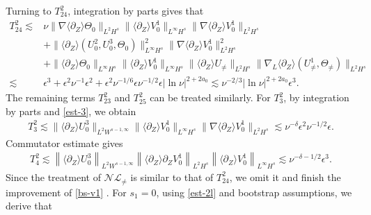 \documentclass[12pt]{article}
\newcommand{\wtb}{\langle\partial_Z\rangle }
\newcommand{\nm}[2]{\left\| #1 \right\| _{#2} }
\numberwithin{equation}{section}
\begin{document}
	Turning to $T^2_{24}$, integration by parts gives that
	\begin{align*}
		T^2_{24}\lesssim& \nu \|\nabla \wtb \Theta_0\|_{L^2H^s}\|\wtb V^1_0\|_{L^\infty H^s}\|\nabla \wtb V^1_0\|_{L^2H^s}\\
		&+\|\wtb (U^{2}_0, U_0^3 ,\Theta_0)\|^2_{L^\infty H^s}\|\nabla \wtb V^1_0\|^2_{L^2H^s}\\
		&+\|\wtb \Theta_0\|_{L^\infty H^s}\|\wtb V^1_0\|_{L^\infty H^s}\|\wtb U_{\neq}\|_{L^2H^s}\|\nabla_L\wtb(U^1_{\neq},\Theta_{\neq})\|_{L^2H^s}\\
        \lesssim& \epsilon^3 +\epsilon^2\nu^{-1}\epsilon^2+\epsilon^2\nu^{-1/6}\epsilon\nu^{-1/2}\epsilon |\ln{\nu}|^{2+2a_0}\lesssim \nu^{-2/3} |\ln{\nu}|^{2+2a_0} \epsilon^3.
	\end{align*}
	The remaining terms $T^2_{23}$ and $T^2_{25}$ can be treated similarly. For $T^2_3$, by integration by parts and \eqref{est-3}, we obtain
	\begin{align*}
		T^2_3\lesssim\|\wtb U^3_0\|_{L^2W^{s-1,\infty}}\|\wtb V^1_0\|_{L^\infty H^s}\|\nabla \wtb V^1_0\|_{L^2H^s}\lesssim \nu^{-\delta}\epsilon^2\nu^{-1/2}\epsilon.
	\end{align*}
    Commutator estimate gives
    \begin{align*}
        T^2_4 \lesssim \nm{\wtb U^3_0}{{L^2W^{s-1,\infty}}}  \nm{\wtb \partial_Z V^1_0}{L^2 H^{s}} \nm{\wtb V^1_0}{L^{\infty} H^s} \lesssim \nu^{-\delta-1/2}\epsilon^3.
    \end{align*}
    \color{black}
	Since the treatment of $\mathcal{NL}_{\neq}$ is similar to that of  $T^2_{24}$, we omit it and finish the improvement of \eqref{bs-v1} .
    For $s_1=0$, using \eqref{est-2l} and bootstrap assumptions, we derive that
\end{document}
